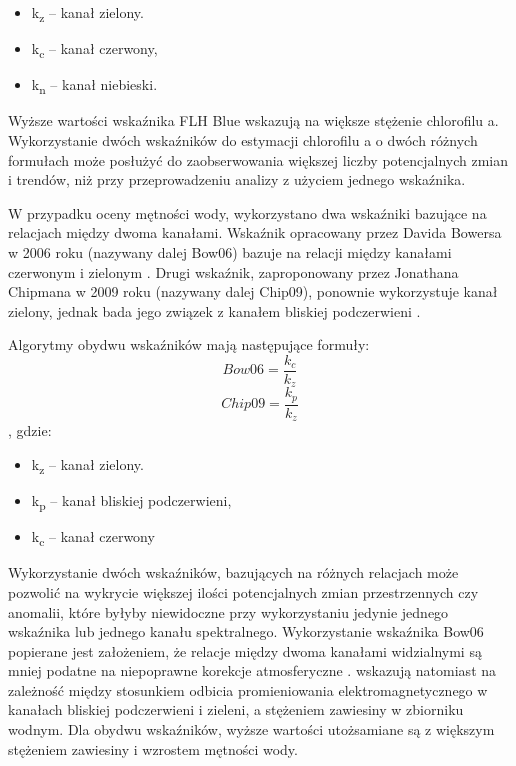 \documentclass{amuthesis}
\begin{document}
\begin{itemize}
\tightlist
\item
  k\textsubscript{z} -- kanał zielony.
\item
  k\textsubscript{c} -- kanał czerwony,
\item
  k\textsubscript{n} -- kanał niebieski.
\end{itemize}

Wyższe wartości wskaźnika FLH Blue wskazują na większe stężenie
chlorofilu a. Wykorzystanie dwóch wskaźników do estymacji chlorofilu a o
dwóch różnych formułach może posłużyć do zaobserwowania większej liczby
potencjalnych zmian i trendów, niż przy przeprowadzeniu analizy z
użyciem jednego wskaźnika.

W przypadku oceny mętności wody, wykorzystano dwa wskaźniki bazujące na
relacjach między dwoma kanałami. Wskaźnik opracowany przez Davida
Bowersa w 2006 roku (nazywany dalej Bow06) bazuje na relacji między
kanałami czerwonym i zielonym \autocite{bowers2006optical}. Drugi
wskaźnik, zaproponowany przez Jonathana Chipmana w 2009 roku (nazywany
dalej Chip09), ponownie wykorzystuje kanał zielony, jednak bada jego
związek z kanałem bliskiej podczerwieni \autocite{Chipman2009}.

Algorytmy obydwu wskaźników mają następujące formuły: \[
Bow06 = \frac{k_c}{k_z}
\] \[
Chip09 = \frac{k_p}{k_z}
\] , gdzie:

\begin{itemize}
\tightlist
\item
  k\textsubscript{z} -- kanał zielony.
\item
  k\textsubscript{p} -- kanał bliskiej podczerwieni,
\item
  k\textsubscript{c} -- kanał czerwony
\end{itemize}

Wykorzystanie dwóch wskaźników, bazujących na różnych relacjach może
pozwolić na wykrycie większej ilości potencjalnych zmian przestrzennych
czy anomalii, które byłyby niewidoczne przy wykorzystaniu jedynie
jednego wskaźnika lub jednego kanału spektralnego. Wykorzystanie
wskaźnika Bow06 popierane jest założeniem, że relacje między dwoma
kanałami widzialnymi są mniej podatne na niepoprawne korekcje
atmosferyczne \autocite{bowers2006optical}. \textcite{Chipman2009}
wskazują natomiast na zależność między stosunkiem odbicia promieniowania
elektromagnetycznego w kanałach bliskiej podczerwieni i zieleni, a
stężeniem zawiesiny w zbiorniku wodnym. Dla obydwu wskaźników, wyższe
wartości utożsamiane są z większym stężeniem zawiesiny i wzrostem
mętności wody.
\end{document}
